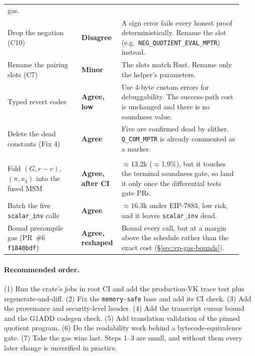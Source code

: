 \begin{center}
\begin{longtable}{@{}p{0.30\linewidth}p{0.14\linewidth}p{0.49\linewidth}@{}}
  gas. \\
Drop the negation (C10) & \textbf{Disagree} &
  A sign error fails every honest proof deterministically. Rename the slot
  (e.g.\ \texttt{NEG\_\allowbreak{}QUOTIENT\_\allowbreak{}EVAL\_\allowbreak{}MPTR}) instead. \\
Rename the pairing slots (C7) & \textbf{Minor} &
  The slots match Rust. Rename only the helper's parameters. \\
Typed revert codes & \textbf{Agree, low} &
  Use 4-byte custom errors for debuggability. The success-path cost is
  unchanged and there is no soundness value. \\
Delete the dead constants (Fix 4) & \textbf{Agree} &
  Five are confirmed dead by slither. \texttt{Q\_COM\_MPTR} is already
  commented as a marker. \\
\addlinespace
\multicolumn{3}{@{}l}{\emph{Gas}} \\
Fold $(G, r-v)$, $(\pi, x_3)$ into the fused MSM & \textbf{Agree, after CI} &
  $\approx$13.2k ($\approx$1.9\%), but it touches the terminal soundness
  gate, so land it only once the differential tests gate PRs. \\
Batch the five \texttt{scalar\_inv} calls & \textbf{Agree} &
  $\approx$16.3k under EIP-7883, low risk, and it leaves
  \texttt{scalar\_inv} dead. \\
Bound precompile gas (PR~\#6 \texttt{f1840bdf}) & \textbf{Agree, reshaped} &
  Bound every call, but at a margin above the schedule rather than the
  exact cost (\S\ref{sec:vp-gas-bounds}). \\
\bottomrule
\end{longtable}
\end{center}

\paragraph{Recommended order.} (1) Run the crate's jobs in root CI and add
the production-VK trace test plus regenerate-and-diff. (2) Fix the
\texttt{memory-safe} base and add its CI check. (3) Add the provenance and
security-level header. (4) Add the transcript cursor bound and the G1ADD
codegen check. (5) Add translation validation of the pinned quotient
program. (6) Do the readability work behind a bytecode-equivalence gate.
(7) Take the gas wins last. Steps 1--3 are small, and without them every
later change is unverified in practice.
